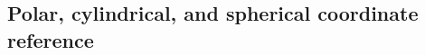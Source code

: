 \documentclass[indent]{watsonbook}
\begin{document}
\subsection{Polar, cylindrical, and spherical coordinate reference}
%
%
%
%
%
%
%
%
%
%
%
%
%
%
%
%
\end{document}
